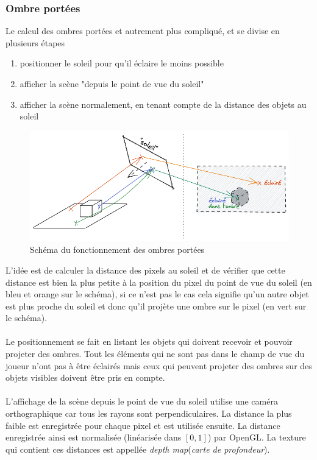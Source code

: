 \documentclass[11pt]{article} %
\begin{document}
\subsubsection{Ombre portées}
Le calcul des ombres portées et autrement plus compliqué, et se divise en plusieurs étapes
\begin{enumerate}
\itemsep-.5em
\item positionner le soleil pour qu'il éclaire le moins possible
\item afficher la scène "depuis le point de vue du soleil"
\item afficher la scène normalement, en tenant compte de la distance des objets au soleil
\end{enumerate}

\begin{figure}[h]
	\centering
	\includegraphics[scale=.49]{ombres}
	\caption{Schéma du fonctionnement des ombres portées}
	\label{fig:shadows_schema}
\end{figure}

L'idée est de calculer la distance des pixels au soleil et de vérifier que cette distance est bien la plus petite à la position du pixel du point de vue du soleil (en bleu et orange sur le schéma), si ce n'est pas le cas cela signifie qu'un autre objet est plus proche du soleil et donc qu'il projète une ombre sur le pixel (en vert sur le schéma).

\paragraph{}
Le positionnement se fait en listant les objets qui doivent recevoir et pouvoir projeter des ombres. Tout les éléments qui ne sont pas dans le champ de vue du joueur n'ont pas à être éclairés mais ceux qui peuvent projeter des ombres sur des objets visibles doivent être pris en compte.
\paragraph{}
L'affichage de la scène depuis le point de vue du soleil utilise une caméra orthographique car tous les rayons sont perpendiculaires. La distance la plus faible est enregistrée pour chaque pixel et est utilisée ensuite. La distance enregistrée ainsi est normalisée (linéarisée dans $[0,1]$) par OpenGL. La texture qui contient ces distances est appellée \textit{depth map}(\textit{carte de profondeur}).
\end{document}
